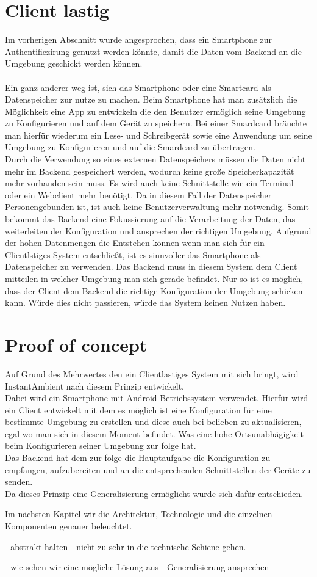 \section{Client lastig}

Im vorherigen Abschnitt wurde angesprochen, dass ein Smartphone zur Authentifiezirung genutzt werden könnte, damit die Daten vom Backend an die Umgebung geschickt werden können. 
\\\\
Ein ganz anderer weg ist, sich das Smartphone oder eine Smartcard als Datenspeicher zur nutze zu machen. Beim Smartphone hat man zusätzlich die Möglichkeit eine App zu entwickeln die den Benutzer ermöglich seine Umgebung zu Konfigurieren und auf dem Gerät zu speichern. Bei einer Smardcard bräuchte man hierfür wiederum ein Lese- und Schreibgerät sowie eine Anwendung um seine Umgebung zu Konfigurieren und auf die Smardcard zu übertragen. \\
Durch die Verwendung so eines externen Datenspeichers müssen die Daten nicht mehr im Backend gespeichert werden, wodurch keine große Speicherkapazität mehr vorhanden sein muss. Es wird auch keine Schnittstelle wie ein Terminal oder ein Webclient mehr benötigt. Da in diesem Fall der Datenspeicher Personengebunden ist, ist auch keine Benutzerverwaltung mehr notwendig. Somit bekommt das Backend eine Fokussierung auf die Verarbeitung der Daten, das weiterleiten der Konfiguration und ansprechen der richtigen Umgebung. Aufgrund der hohen Datenmengen die Entstehen können wenn man sich für ein Clientlstiges System entschließt, ist es sinnvoller das Smartphone als Datenspeicher zu verwenden. 
Das Backend muss in diesem System dem Client mitteilen in welcher Umgebung man sich gerade befindet. Nur so ist es möglich, dass der Client dem Backend die richtige Konfiguration der Umgebung schicken kann. Würde dies nicht passieren, würde das System keinen Nutzen haben.

\section{Proof of concept}

Auf Grund des Mehrwertes den ein Clientlastiges System mit sich bringt, wird InstantAmbient nach diesem Prinzip entwickelt.\\
Dabei wird ein Smartphone mit Android Betriebssystem verwendet. 
Hierfür wird ein Client entwickelt mit dem es möglich ist eine Konfiguration für eine bestimmte Umgebung zu erstellen und diese auch bei belieben zu aktualisieren, egal wo man sich in diesem Moment befindet. Was eine hohe Ortsunabhägigkeit beim Konfigurieren seiner Umgebung zur folge hat. \\   
Das Backend hat dem zur folge die Hauptaufgabe die Konfiguration zu empfangen, aufzubereiten und an die entsprechenden Schnittstellen der Geräte zu senden. \\ 
Da dieses Prinzip eine Generalisierung ermöglicht wurde sich dafür entschieden.  


Im nächsten Kapitel wir die Architektur, Technologie und die einzelnen Komponenten genauer beleuchtet.


- abstrakt halten
- nicht zu sehr in die technische Schiene gehen. 

- wie sehen wir eine mögliche Lösung aus
- Generalisierung ansprechen